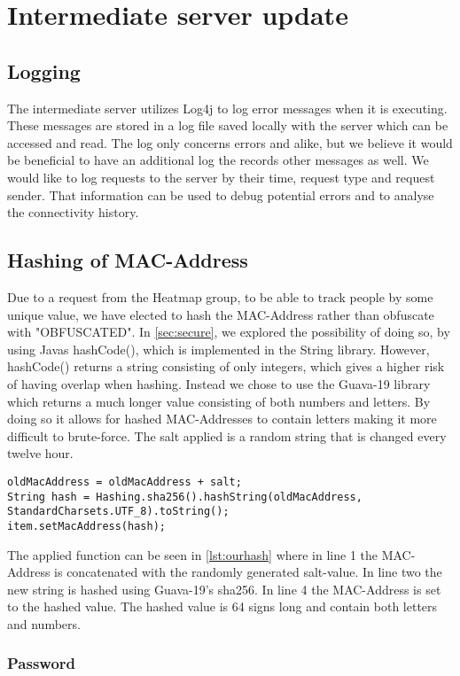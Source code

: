 \section{Intermediate server update}

\subsection*{Logging}
The intermediate server utilizes Log4j\cite{log4j} to log error messages when it is executing. These messages are stored in a log file saved locally with the server which can be accessed and read. The log only concerns errors and alike, but we believe it would be beneficial to have an additional log the records other messages as well. We would like to log requests to the server by their time, request type and request sender. That information can be used to debug potential errors and to analyse the connectivity history. 

\subsection*{Hashing of MAC-Address}
Due to a request from the Heatmap group, to be able to track people by some unique value, we have elected to hash the MAC-Address rather than obfuscate with "OBFUSCATED". In \cref{sec:secure}, we explored the possibility of doing so, by using Javas hashCode(), which is implemented in the String library. However, hashCode() returns a string consisting of only integers, which gives a higher risk of having overlap when hashing. Instead we chose to use the Guava-19 library which returns a much longer value consisting of both numbers and letters. By doing so it allows for hashed MAC-Addresses to contain letters making it more difficult to brute-force. The salt applied is a random string that is changed every twelve hour. 

\begin{lstlisting}[caption={Hashing a MAC-Address},label={lst:ourhash},language=inc_Java]
oldMacAddress = oldMacAddress + salt;
String hash = Hashing.sha256().hashString(oldMacAddress, 
StandardCharsets.UTF_8).toString();
item.setMacAddress(hash);
\end{lstlisting}

The applied function can be seen in \cref{lst:ourhash} where in line 1 the MAC-Address is concatenated with the randomly generated salt-value. In line two the new string is hashed using Guava-19's sha256. In line 4 the MAC-Address is set to the hashed value. The hashed value is 64 signs long and contain both letters and numbers.




\subsubsection*{Password}

